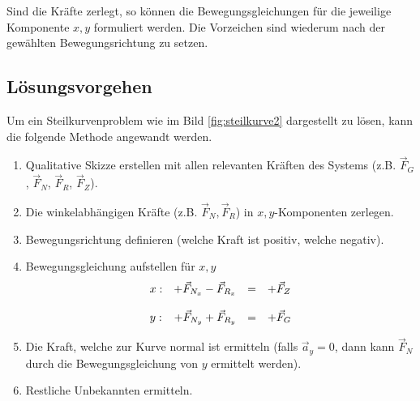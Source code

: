 \noindent
Sind die Kräfte zerlegt, so können die Bewegungsgleichungen für die 
jeweilige Komponente $x,y$ formuliert werden. Die Vorzeichen sind 
wiederum nach der gewählten Bewegungsrichtung zu setzen. 

\subsection{Lösungsvorgehen}
Um ein Steilkurvenproblem wie im Bild \ref{fig:steilkurve2} dargestellt
zu lösen, kann die folgende Methode angewandt werden.

\begin{enumerate}
	\item Qualitative Skizze erstellen mit allen relevanten Kräften
		des Systems (z.B. $\vec{F}_G$, $\vec{F}_N$, $\vec{F}_R$, 
		$\vec{F}_Z$).
	\item Die winkelabhängigen Kräfte (z.B. $\vec{F}_N, \vec{F}_R$) 
		in $x,y$-Komponenten zerlegen.
	\item Bewegungsrichtung definieren (welche Kraft ist positiv, 
		welche negativ).
	\item Bewegungsgleichung aufstellen für $x,y$
\[\begin{array}{l r c l}
	x: &
		+ \vec{F}_{N_x} - \vec{F}_{R_x} &=& + \vec{F}_Z \\
	& & & \\
	y: &
		+ \vec{F}_{N_y} + \vec{F}_{R_y} &=& + \vec{F}_G
\end{array} \]

	\item Die Kraft, welche zur Kurve normal ist ermitteln (falls
		$\vec{a}_y=0$, dann kann $\vec{F}_N$ durch die
		Bewegungsgleichung von $y$ ermittelt werden).
	\item Restliche Unbekannten ermitteln.
\end{enumerate}
